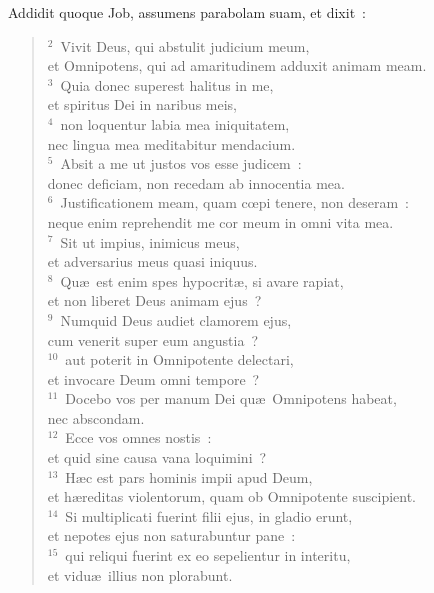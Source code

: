 \lettrine[lines=10,image=true,loversize=0.05,lraise=-0.03]{A}{}ddidit quoque Job, assumens parabolam suam, et dixit~:
\begin{flushleft}\begin{verse}\vspace{6pt}${}^{2}$~Vivit Deus, qui abstulit judicium meum,\\ et Omnipotens, qui ad amaritudinem adduxit animam meam.\\
${}^{3}$~Quia donec superest halitus in me,\\ et spiritus Dei in naribus meis,\\
${}^{4}$~non loquentur labia mea iniquitatem,\\ nec lingua mea meditabitur mendacium.\\
${}^{5}$~Absit a me ut justos vos esse judicem~:\\ donec deficiam, non recedam ab innocentia mea.\\
${}^{6}$~Justificationem meam, quam cœpi tenere, non deseram~:\\ neque enim reprehendit me cor meum in omni vita mea.\\
${}^{7}$~Sit ut impius, inimicus meus,\\ et adversarius meus quasi iniquus.\\
${}^{8}$~Qu\ae\ est enim spes hypocrit\ae , si avare rapiat,\\ et non liberet Deus animam ejus~?\\
${}^{9}$~Numquid Deus audiet clamorem ejus,\\ cum venerit super eum angustia~?\\
${}^{10}$~aut poterit in Omnipotente delectari,\\ et invocare Deum omni tempore~?\\
${}^{11}$~Docebo vos per manum Dei qu\ae\ Omnipotens habeat,\\ nec abscondam.\\
${}^{12}$~Ecce vos omnes nostis~:\\ et quid sine causa vana loquimini~?\\
${}^{13}$~H\ae c est pars hominis impii apud Deum,\\ et h\ae reditas violentorum, quam ob Omnipotente suscipient.\\
${}^{14}$~Si multiplicati fuerint filii ejus, in gladio erunt,\\ et nepotes ejus non saturabuntur pane~:\\
${}^{15}$~qui reliqui fuerint ex eo sepelientur in interitu,\\ et vidu\ae\ illius non plorabunt.\\

\end{verse}
\end{flushleft}
